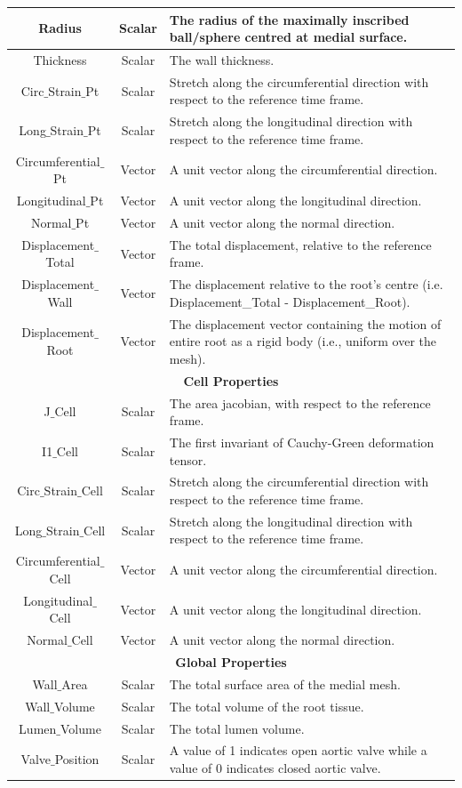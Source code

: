\documentclass{article}
\begin{document}
\begin{tabular}{|c|c|p{9.4cm}|}
	\hline
Radius	&Scalar & The radius of the maximally inscribed ball/sphere centred at medial surface.\\
\hline
Thickness	&Scalar & The wall thickness.\\
	\hline
Circ$\_$Strain$\_$Pt	& Scalar & Stretch along the circumferential direction with respect to the reference time frame.\\
\hline
Long$\_$Strain$\_$Pt	& Scalar & Stretch along the longitudinal direction with respect to the reference time frame.\\
	\hline
Circumferential$\_$Pt	& Vector & A unit vector along the circumferential direction. \\
	\hline
Longitudinal$\_$Pt	&Vector & A unit vector along the longitudinal direction.\\
	\hline
Normal$\_$Pt	&Vector & A unit vector along the normal direction.\\
\hline
Displacement$\_$Total & Vector & The total displacement, relative to the reference frame. \\
	\hline
Displacement$\_$Wall & Vector & The displacement relative to the root's centre \newline (i.e. Displacement\_Total - Displacement\_Root). \\
	\hline
Displacement$\_$Root  &  Vector& The displacement vector containing the motion of entire root as a rigid body (i.e., uniform over the mesh).\\
\hline
\hline
\multicolumn{3}{|c|}{\textbf{Cell Properties}} \\
\hline
J$\_$Cell	& Scalar& The area jacobian, with respect to the reference frame.\\
\hline
I1$\_$Cell& Scalar & The first invariant of Cauchy-Green deformation tensor. \\
\hline
Circ$\_$Strain$\_$Cell & Scalar & Stretch along the circumferential direction with respect to the reference time frame.\\
\hline
Long$\_$Strain$\_$Cell & Scalar & Stretch along the longitudinal direction with respect to the reference time frame. \\
	\hline
Circumferential$\_$Cell	&  Vector  & A unit vector along the circumferential direction.\\
	\hline
Longitudinal$\_$Cell 	&  Vector & A unit vector along the longitudinal direction.\\
	\hline
Normal$\_$Cell 	&  Vector & A unit vector along the normal direction.\\
\hline
\hline
\multicolumn{3}{|c|}{\textbf{Global  Properties}} \\
\hline
Wall$\_$Area	&Scalar &The total surface area of the medial mesh. \\
	\hline
	Wall$\_$Volume	&Scalar &The total volume of the root tissue. \\
	\hline
	Lumen$\_$Volume	&Scalar &The total lumen volume. \\	
	\hline
Valve$\_$Position	&Scalar & A value of 1 indicates open aortic valve while a value of 0 indicates closed aortic valve.\\
	\hline
\end{tabular}
\end{document}
